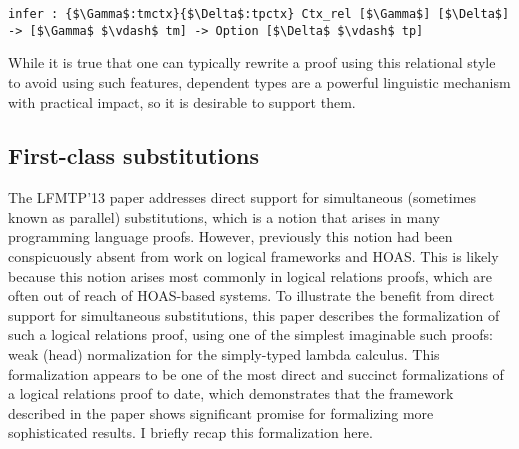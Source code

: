 \documentclass{article}
\begin{document}
\begin{lstlisting}
infer : {$\Gamma$:tmctx}{$\Delta$:tpctx} Ctx_rel [$\Gamma$] [$\Delta$] -> [$\Gamma$ $\vdash$ tm] -> Option [$\Delta$ $\vdash$ tp]
\end{lstlisting}

While it is true that one can typically rewrite a proof using this
relational style to avoid using such features, dependent types are a
powerful linguistic mechanism with practical impact,
 so it is desirable to support them.

\subsection{First-class substitutions}\label{sec:lfmtp13}
The LFMTP'13 paper \citep{Cave13} addresses direct support for
simultaneous (sometimes known as parallel)
substitutions, which is a notion that arises in many programming
language proofs. However, previously this notion had been
conspicuously absent from work on logical frameworks and HOAS. This is
likely because this notion arises most commonly in logical relations
proofs, which are often out of reach of HOAS-based systems. To
illustrate the benefit from direct support for
simultaneous substitutions, this paper describes the formalization of such
a logical relations proof, using one of the simplest
imaginable such proofs: weak (head) normalization for the
simply-typed lambda calculus. This formalization appears to be one of
the most direct and succinct formalizations of a logical relations
proof to date, which demonstrates that the framework described in the
paper shows significant promise for formalizing more sophisticated results. I briefly recap
this formalization here. 



\end{document}
